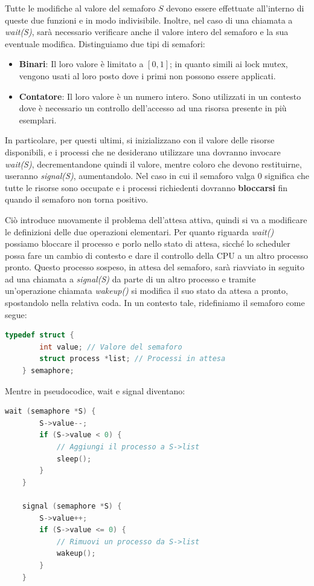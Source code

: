\noindent Tutte le modifiche al valore del semaforo $S$ devono essere effettuate all'interno di queste due funzioni e in modo indivisibile. Inoltre,
nel caso di una chiamata a \textit{wait(S)}, sarà necessario verificare anche il valore intero del semaforo e la sua eventuale modifica. Distinguiamo
due tipi di semafori: \begin{itemize}
    \item \textbf{Binari}: Il loro valore è limitato a $[0,1]$; in quanto simili ai lock mutex, vengono usati al loro posto dove i primi non possono
    essere applicati.
    \item \textbf{Contatore}: Il loro valore è un numero intero. Sono utilizzati in un contesto dove è necessario un controllo dell'accesso ad una
    risorsa presente in più esemplari.
\end{itemize}

\noindent In particolare, per questi ultimi, si inizializzano con il valore delle risorse disponibili, e i processi che ne desiderano utilizzare una
dovranno invocare \textit{wait(S)}, decrementandone quindi il valore, mentre coloro che devono restituirne, useranno \textit{signal(S)}, aumentandolo.
Nel caso in cui il semaforo valga $0$ significa che tutte le risorse sono occupate e i processi richiedenti dovranno \textbf{bloccarsi} fin quando il
semaforo non torna positivo.\par
Ciò introduce nuovamente il problema dell'attesa attiva, quindi si va a modificare le definizioni delle due operazioni elementari. Per quanto riguarda
\textit{wait()} possiamo bloccare il processo e porlo nello stato di attesa, sicché lo scheduler possa fare un cambio di contesto e dare il controllo
della CPU a un altro processo pronto. Questo processo sospeso, in attesa del semaforo, sarà riavviato in seguito ad una chiamata a \textit{signal(S)}
da parte di un altro processo e tramite un'operazione chiamata \textit{wakeup()} si modifica il suo stato da attesa a pronto, spostandolo nella relativa
coda. In un contesto tale, ridefiniamo il semaforo come segue: \begin{lstlisting}[language=C]
    typedef struct {
        int value; // Valore del semaforo
        struct process *list; // Processi in attesa
    } semaphore;
\end{lstlisting}

\noindent Mentre in pseudocodice, wait e signal diventano: \begin{lstlisting}[language=C]
    wait (semaphore *S) {
        S->value--;
        if (S->value < 0) {
            // Aggiungi il processo a S->list
            sleep();
        }
    }

    signal (semaphore *S) {
        S->value++;
        if (S->value <= 0) {
            // Rimuovi un processo da S->list
            wakeup();
        }
    }
\end{lstlisting}

